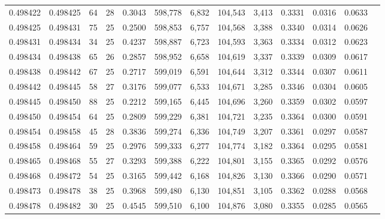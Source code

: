 \begin{tabular}{rrrrrrrrrrrrr}
0.498422 & 0.498425 &  64 &  28 &                                     0.3043 & 598,778 &   6,832 & 104,543 &   3,413 & 0.3331 & 0.0316 & 0.0633 \\
0.498425 & 0.498431 &  75 &  25 &                                     0.2500 & 598,853 &   6,757 & 104,568 &   3,388 & 0.3340 & 0.0314 & 0.0626 \\
0.498431 & 0.498434 &  34 &  25 &                                     0.4237 & 598,887 &   6,723 & 104,593 &   3,363 & 0.3334 & 0.0312 & 0.0623 \\
0.498434 & 0.498438 &  65 &  26 &                                     0.2857 & 598,952 &   6,658 & 104,619 &   3,337 & 0.3339 & 0.0309 & 0.0617 \\
0.498438 & 0.498442 &  67 &  25 &                                     0.2717 & 599,019 &   6,591 & 104,644 &   3,312 & 0.3344 & 0.0307 & 0.0611 \\
0.498442 & 0.498445 &  58 &  27 &                                     0.3176 & 599,077 &   6,533 & 104,671 &   3,285 & 0.3346 & 0.0304 & 0.0605 \\
0.498445 & 0.498450 &  88 &  25 &                                     0.2212 & 599,165 &   6,445 & 104,696 &   3,260 & 0.3359 & 0.0302 & 0.0597 \\
0.498450 & 0.498454 &  64 &  25 &                                     0.2809 & 599,229 &   6,381 & 104,721 &   3,235 & 0.3364 & 0.0300 & 0.0591 \\
0.498454 & 0.498458 &  45 &  28 &                                     0.3836 & 599,274 &   6,336 & 104,749 &   3,207 & 0.3361 & 0.0297 & 0.0587 \\
0.498458 & 0.498464 &  59 &  25 &                                     0.2976 & 599,333 &   6,277 & 104,774 &   3,182 & 0.3364 & 0.0295 & 0.0581 \\
0.498465 & 0.498468 &  55 &  27 &                                     0.3293 & 599,388 &   6,222 & 104,801 &   3,155 & 0.3365 & 0.0292 & 0.0576 \\
0.498468 & 0.498472 &  54 &  25 &                                     0.3165 & 599,442 &   6,168 & 104,826 &   3,130 & 0.3366 & 0.0290 & 0.0571 \\
0.498473 & 0.498478 &  38 &  25 &                                     0.3968 & 599,480 &   6,130 & 104,851 &   3,105 & 0.3362 & 0.0288 & 0.0568 \\
0.498478 & 0.498482 &  30 &  25 &                                     0.4545 & 599,510 &   6,100 & 104,876 &   3,080 & 0.3355 & 0.0285 & 0.0565 \\

\end{tabular}
